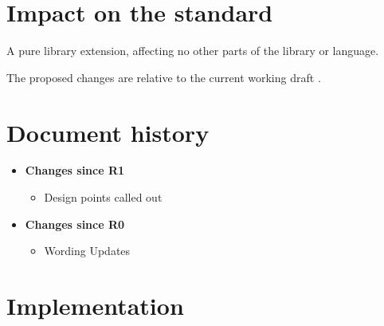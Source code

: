 \documentclass[a4paper,10pt,oneside,openany,final,article]{memoir}
\begin{document}
\begin{wording}



\end{wording}

\chapter{Impact on the standard}

A pure library extension, affecting no other parts of the library or language.

The proposed changes are relative to the current working draft \cite{N4910}.

\chapter*{Document history}

\begin{itemize}
\item \textbf{Changes since R1}
  \begin{itemize}
  \item Design points called out
  \end{itemize}
\item \textbf{Changes since R0}
  \begin{itemize}
  \item Wording Updates
  \end{itemize}
\end{itemize}

\renewcommand{\bibname}{References}




\backmatter
\chapter*{Implementation}
\end{document}

